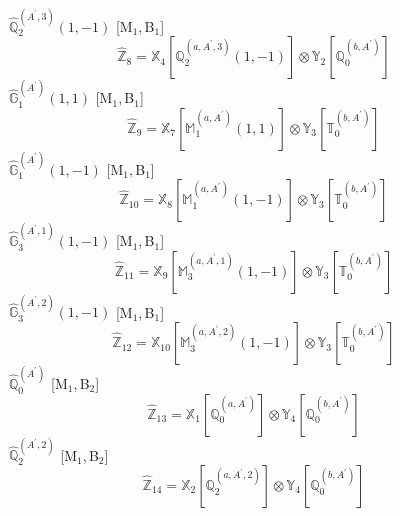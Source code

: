 \documentclass[fleqn,10pt,landscape]{article}
\begin{document}
\begin{itemize}
\begin{dmath*}
\end{dmath*}
\vspace{4mm}
\noindent {} $\,\,\,\hat{\mathbb{Q}}_{2}^{(A^{\prime},3)}(1,-1)$ [M$_{1}$,\,B$_{1}$]
\begin{dmath*}
\hat{\mathbb{Z}}_{8}=\mathbb{X}_{4}[\mathbb{Q}_{2}^{(a,A^{\prime},3)}(1,-1)] \otimes\mathbb{Y}_{2}[\mathbb{Q}_{0}^{(b,A^{\prime})}]
\end{dmath*}
\vspace{4mm}
\noindent {} $\,\,\,\hat{\mathbb{G}}_{1}^{(A^{\prime})}(1,1)$ [M$_{1}$,\,B$_{1}$]
\begin{dmath*}
\hat{\mathbb{Z}}_{9}=\mathbb{X}_{7}[\mathbb{M}_{1}^{(a,A^{\prime})}(1,1)] \otimes\mathbb{Y}_{3}[\mathbb{T}_{0}^{(b,A^{\prime})}]
\end{dmath*}
\vspace{4mm}
\noindent {} $\,\,\,\hat{\mathbb{G}}_{1}^{(A^{\prime})}(1,-1)$ [M$_{1}$,\,B$_{1}$]
\begin{dmath*}
\hat{\mathbb{Z}}_{10}=\mathbb{X}_{8}[\mathbb{M}_{1}^{(a,A^{\prime})}(1,-1)] \otimes\mathbb{Y}_{3}[\mathbb{T}_{0}^{(b,A^{\prime})}]
\end{dmath*}
\vspace{4mm}
\noindent {} $\,\,\,\hat{\mathbb{G}}_{3}^{(A^{\prime},1)}(1,-1)$ [M$_{1}$,\,B$_{1}$]
\begin{dmath*}
\hat{\mathbb{Z}}_{11}=\mathbb{X}_{9}[\mathbb{M}_{3}^{(a,A^{\prime},1)}(1,-1)] \otimes\mathbb{Y}_{3}[\mathbb{T}_{0}^{(b,A^{\prime})}]
\end{dmath*}
\vspace{4mm}
\noindent {} $\,\,\,\hat{\mathbb{G}}_{3}^{(A^{\prime},2)}(1,-1)$ [M$_{1}$,\,B$_{1}$]
\begin{dmath*}
\hat{\mathbb{Z}}_{12}=\mathbb{X}_{10}[\mathbb{M}_{3}^{(a,A^{\prime},2)}(1,-1)] \otimes\mathbb{Y}_{3}[\mathbb{T}_{0}^{(b,A^{\prime})}]
\end{dmath*}
\vspace{4mm}
\noindent {} $\,\,\,\hat{\mathbb{Q}}_{0}^{(A^{\prime})}$ [M$_{1}$,\,B$_{2}$]
\begin{dmath*}
\hat{\mathbb{Z}}_{13}=\mathbb{X}_{1}[\mathbb{Q}_{0}^{(a,A^{\prime})}] \otimes\mathbb{Y}_{4}[\mathbb{Q}_{0}^{(b,A^{\prime})}]
\end{dmath*}
\vspace{4mm}
\noindent {} $\,\,\,\hat{\mathbb{Q}}_{2}^{(A^{\prime},2)}$ [M$_{1}$,\,B$_{2}$]
\begin{dmath*}
\hat{\mathbb{Z}}_{14}=\mathbb{X}_{2}[\mathbb{Q}_{2}^{(a,A^{\prime},2)}] \otimes\mathbb{Y}_{4}[\mathbb{Q}_{0}^{(b,A^{\prime})}]

\end{dmath*}
\end{itemize}
\end{document}
